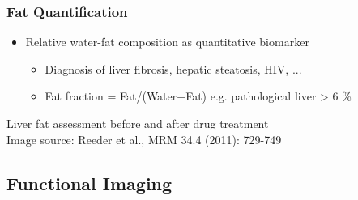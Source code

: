 \begin{frame}
\frametitle{Fat Quantification}
\begin{itemize}
	\item Relative water-fat composition as quantitative biomarker
		\begin{itemize}
			\item Diagnosis of liver fibrosis, hepatic steatosis, HIV, ...
			\item Fat fraction = Fat/(Water+Fat) e.g. pathological liver > 6 \%
		\end{itemize}
\end{itemize}
\vspace{-0.1ex}

	\begin{figure}
		\centering
\end{figure}
\vspace{-4ex}

\centering
\fontsize{8.4}{8.4}\selectfont
Liver fat assessment before and after drug treatment \\ Image source: Reeder et al., MRM 34.4 (2011): 729-749
\end{frame}




\subsection{Functional Imaging} %
\label{sub:functional_imaging}

